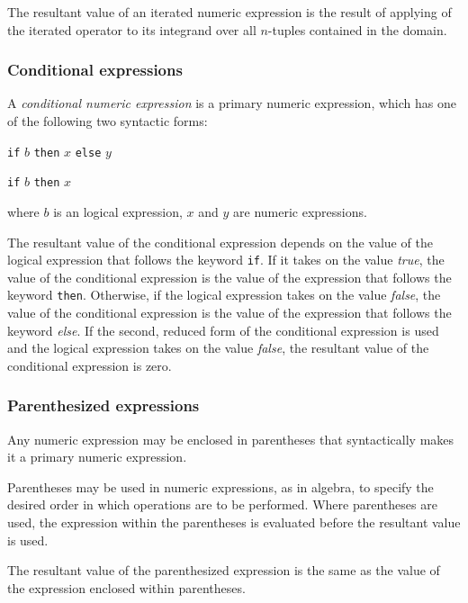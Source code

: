 \documentclass[10pt]{article}
\begin{document}
The resultant value of an iterated numeric expression is the result of
applying of the iterated operator to its integrand over all $n$-tuples
contained in the domain.

\subsubsection{Conditional expressions}
\label{ifthen}

A {\it conditional numeric expression} is a primary numeric expression,
which has one of the following two syntactic forms:

\medskip

\noindent\hfil
{\tt if} $b$ {\tt then} $x$ {\tt else} $y$

\medskip

\noindent\hspace{126.5pt}
{\tt if} $b$ {\tt then} $x$

\medskip

\noindent where $b$ is an logical expression, $x$ and $y$ are numeric
expressions.

The resultant value of the conditional expression depends on the value
of the logical expression that follows the keyword {\tt if}. If it
takes on the value {\it true}, the value of the conditional expression
is the value of the expression that follows the keyword {\tt then}.
Otherwise, if the logical expression takes on the value {\it false},
the value of the conditional expression is the value of the expression
that follows the keyword {\it else}. If the second, reduced form of the
conditional expression is used and the logical expression takes on the
value {\it false}, the resultant value of the conditional expression is
zero.

\subsubsection{Parenthesized expressions}

Any numeric expression may be enclosed in parentheses that
syntactically makes it a primary numeric expression.

Parentheses may be used in numeric expressions, as in algebra, to
specify the desired order in which operations are to be performed.
Where parentheses are used, the expression within the parentheses is
evaluated before the resultant value is used.

The resultant value of the parenthesized expression is the same as the
value of the expression enclosed within parentheses.
\end{document}
